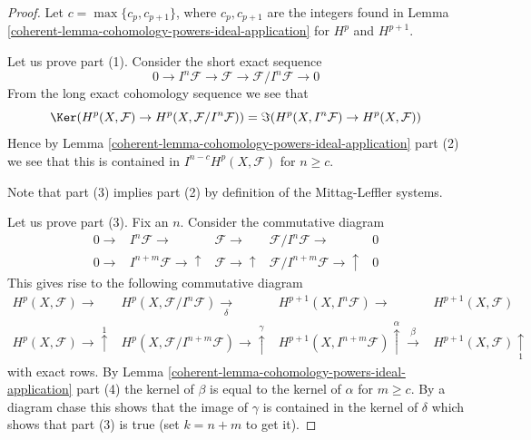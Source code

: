 \begin{proof}

Let $c = \max\{c_p, c_{p + 1}\}$, where $c_p, c_{p + 1}$ are the integers
found in Lemma \ref{coherent-lemma-cohomology-powers-ideal-application} for
$H^p$ and $H^{p + 1}$.

\medskip\noindent
Let us prove part (1). Consider the short exact sequence
$$
0 \to I^n\mathcal{F} \to \mathcal{F} \to \mathcal{F}/I^n\mathcal{F} \to 0
$$
From the long exact cohomology sequence we see that
$$
\Ker(
H^p(X, \mathcal{F}) \to H^p(X, \mathcal{F}/I^n\mathcal{F})
)
=
\Im(
H^p(X, I^n\mathcal{F}) \to H^p(X, \mathcal{F})
)
$$
Hence by Lemma \ref{coherent-lemma-cohomology-powers-ideal-application} part (2)
we see that this is contained in $I^{n - c}H^p(X, \mathcal{F})$ for $n \geq c$.

\medskip\noindent
Note that part (3) implies part (2) by definition of the Mittag-Leffler
systems.

\medskip\noindent
Let us prove part (3). Fix an $n$. Consider the commutative diagram
$$
\begin{array}{ccccc}0 \longrightarrow & I^n\mathcal{F} \longrightarrow & \mathcal{F} \longrightarrow & \mathcal{F}/I^n\mathcal{F} \longrightarrow & 0 \\ 0 \longrightarrow & I^{n + m}\mathcal{F} \longrightarrow\uparrow & \mathcal{F} \longrightarrow\uparrow & \mathcal{F}/I^{n + m}\mathcal{F} \longrightarrow\uparrow & 0\end{array}
$$
This gives rise to the following commutative diagram
$$
\begin{array}{cccc}H^p(X, \mathcal{F}) \longrightarrow & H^p(X, \mathcal{F}/I^n\mathcal{F}) \underset{\delta}{\longrightarrow} & H^{p + 1}(X, I^n\mathcal{F}) \longrightarrow & H^{p + 1}(X, \mathcal{F}) \\ H^p(X, \mathcal{F}) \longrightarrow\overset{1}{\uparrow} & H^p(X, \mathcal{F}/I^{n + m}\mathcal{F}) \longrightarrow\overset{\gamma}{\uparrow} & H^{p + 1}(X, I^{n + m}\mathcal{F}) \overset{\alpha}{\uparrow}\overset{\beta}{\longrightarrow} & H^{p + 1}(X, \mathcal{F}) \underset{1}{\uparrow}\end{array}
$$
with exact rows. By
Lemma \ref{coherent-lemma-cohomology-powers-ideal-application} part (4) the kernel
of $\beta$ is equal to the kernel of $\alpha$ for $m \geq c$.
By a diagram chase this shows that the image of $\gamma$ is contained
in the kernel of $\delta$ which shows that part (3) is true
(set $k = n + m$ to get it).
\end{proof}

